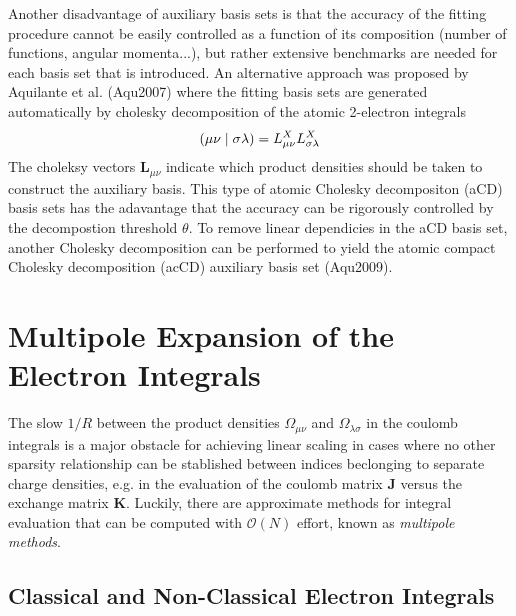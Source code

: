 Another disadvantage of auxiliary basis sets is that the accuracy of the fitting procedure cannot be easily controlled as a function of its composition (number of functions, angular momenta...), but rather extensive benchmarks are needed for each basis set that is introduced. An alternative approach was proposed by Aquilante et al. (Aqu2007) where the fitting basis sets are generated automatically by cholesky decomposition of the atomic 2-electron integrals
\begin{equation}
\left( \mu\nu \mid \sigma\lambda \right) = L^X_{\mu\nu} L^X_{\sigma\lambda}
\end{equation}
\noindent The choleksy vectors $\mathbf{L}_{\mu\nu}$ indicate which product densities should be taken to construct the auxiliary basis. This type of atomic Cholesky decompositon (aCD) basis sets has the adavantage that the accuracy can be rigorously controlled by the decompostion threshold $\theta$. To remove linear dependicies in the aCD basis set, another Cholesky decomposition can be performed to yield the atomic compact Cholesky decomposition (acCD) auxiliary basis set (Aqu2009).


\section{Multipole Expansion of the Electron Integrals}

The slow $1/R$ between the product densities $\Omega_{\mu\nu}$ and $\Omega_{\lambda\sigma}$ in the coulomb integrals is a major obstacle for achieving linear scaling in cases where no other sparsity relationship can be stablished between indices beclonging to separate charge densities, e.g. in the evaluation of the coulomb matrix $\mathbf{J}$ versus the exchange matrix $\mathbf{K}$. Luckily, there are approximate methods for integral evaluation that can be computed with $\mathcal{O}(N)$ effort, known as \emph{multipole methods}.

\subsection{Classical and Non-Classical Electron Integrals}

